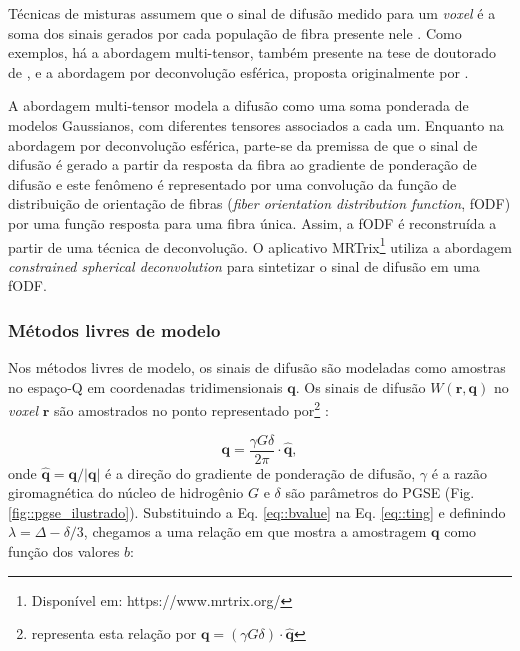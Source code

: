 \documentclass[
    12pt,                %
    oneside,            %
    a4paper,            %
    english,            %
    french,                %
    spanish,            %
    brazil                %
    ]{abntex2}
\begin{document}
Técnicas de misturas assumem que o sinal de difusão medido para um \textit{voxel} é a soma dos sinais gerados por cada população de fibra presente nele \cite{tournier2011}. Como exemplos, há a abordagem multi-tensor, também presente na tese de doutorado de , e a abordagem por deconvolução esférica, proposta originalmente por .

A abordagem multi-tensor modela a difusão como uma soma ponderada de modelos Gaussianos, com diferentes tensores associados a cada um. Enquanto na abordagem por deconvolução esférica, parte-se da premissa de que o sinal de difusão é gerado a partir da resposta da fibra ao gradiente de ponderação de difusão e este fenômeno é representado por uma convolução da função de distribuição de orientação de fibras (\textit{fiber orientation distribution function}, fODF) por uma função resposta para uma fibra única. Assim, a fODF é reconstruída a partir de uma técnica de deconvolução. O aplicativo MRTrix\footnote{Disponível em: https://www.mrtrix.org/} utiliza a abordagem \textit{constrained spherical deconvolution} \cite{tournier2007} para sintetizar o sinal de difusão em uma fODF.

\subsubsection{Métodos livres de modelo}
\label{metodos_livres_de_modelo}

Nos métodos livres de modelo, os sinais de difusão são modeladas como amostras no espaço-Q em coordenadas tridimensionais $\mathbf{q}$. Os sinais de difusão $W(\mathbf{r}, \mathbf{q})$ no \textit{voxel} $\mathbf{r}$ são amostrados no ponto representado por\footnote{ representa esta relação por $\mathbf{q} = (\gamma G \delta)\cdot \mathbf{\hat{q}}$} \cite{yeh2010}:

\begin{equation}
    \label{eq::ting}
    \mathbf{q} = \frac{\gamma G \delta}{2\pi} \cdot \mathbf{\hat{q}},
\end{equation}
onde $\mathbf{\hat{q}} = \mathbf{q}/|\mathbf{q}|$ é a direção do gradiente de ponderação de difusão, $\gamma$ é a razão giromagnética do núcleo de hidrogênio $G$ e $\delta$ são parâmetros do PGSE (Fig. \ref{fig::pgse_ilustrado}). Substituindo a Eq. \ref{eq::bvalue} na Eq. \ref{eq::ting} e definindo $\lambda = \Delta - \delta/3$, chegamos a uma relação em que mostra a amostragem $\mathbf{q}$ como função dos valores $b$:
\end{document}
